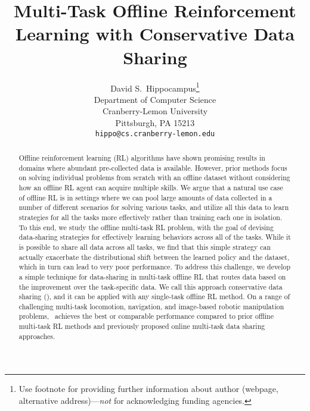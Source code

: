 \documentclass{article}
\title{Multi-Task Offline Reinforcement Learning with Conservative Data Sharing}
\author{%
  David S.~Hippocampus\thanks{Use footnote for providing further information
    about author (webpage, alternative address)---\emph{not} for acknowledging
    funding agencies.} \\
  Department of Computer Science\\
  Cranberry-Lemon University\\
  Pittsburgh, PA 15213 \\
  \texttt{hippo@cs.cranberry-lemon.edu} \\
}
\begin{document}
\maketitle

\begin{abstract}
Offline reinforcement learning (RL) algorithms have shown promising results in domains where abundant pre-collected data is available. However, prior methods focus on solving individual problems from scratch with an offline dataset without considering how an offline RL agent can acquire multiple skills. We argue that a natural use case of offline RL is in settings where we can pool large amounts of data collected in a number of different scenarios for solving various tasks, and utilize all this data to learn strategies for all the tasks more effectively rather than training each one in isolation. To this end, we study the offline multi-task RL problem, with the goal of devising data-sharing strategies for effectively learning behaviors across all of the tasks. While it is possible to share all data across all tasks, we find that this simple strategy can actually exacerbate the distributional shift between the learned policy and the dataset, which in turn can lead to very poor performance.
To address this challenge, we develop a simple technique for data-sharing in multi-task offline RL that routes data based on the improvement over the task-specific data. We call this approach conservative data sharing (\methodname), and it can be applied with any single-task offline RL method. On a range of challenging multi-task locomotion, navigation, and image-based robotic manipulation problems, \methodname\ achieves the best or comparable performance compared to prior offline multi-task RL methods and previously proposed online multi-task data sharing approaches.  
\end{abstract}










\end{document}
